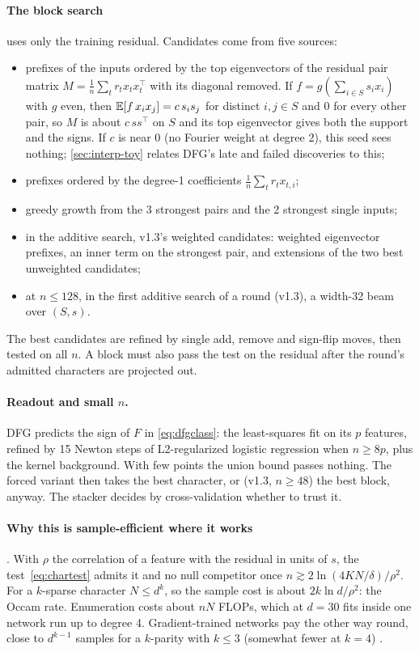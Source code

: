 \paragraph{The block search} uses only the training residual. Candidates come from five sources:
\begin{itemize}
\item prefixes of the inputs ordered by the top eigenvectors of the residual pair matrix $M=\frac1n\sum_tr_tx_tx_t^\top$ with its diagonal removed. If $f=g(\sum_{i\in S}s_ix_i)$ with $g$ even, then $\mathbb{E}[f\,x_ix_j]=c\,s_is_j$ for distinct $i,j\in S$ and 0 for every other pair, so $M$ is about $c\,ss^\top$ on $S$ and its top eigenvector gives both the support and the signs. If $c$ is near 0 (no Fourier weight at degree 2), this seed sees nothing; \cref{sec:interp-toy} relates DFG's late and failed discoveries to this;
\item prefixes ordered by the degree-1 coefficients $\frac1n\sum_tr_tx_{t,i}$;
\item greedy growth from the 3 strongest pairs and the 2 strongest single inputs;
\item in the additive search, v1.3's weighted candidates: weighted eigenvector prefixes, an inner term on the strongest pair, and extensions of the two best unweighted candidates;
\item at $n\le128$, in the first additive search of a round (v1.3), a width-32 beam over $(S,s)$.
\end{itemize}
The best candidates are refined by single add, remove and sign-flip moves, then tested on all $n$. A block must also pass the test on the residual after the round's admitted characters are projected out.

\paragraph{Readout and small $n$.} DFG predicts the sign of $F$ in \eqref{eq:dfgclass}: the least-squares fit on its $p$ features, refined by 15 Newton steps of L2-regularized logistic regression when $n\ge8p$, plus the kernel background. With few points the union bound passes nothing. The forced variant then takes the best character, or (v1.3, $n\ge48$) the best block, anyway. The stacker decides by cross-validation whether to trust it.

\paragraph{Why this is sample-efficient where it works} . With $\rho$ the correlation of a feature with the residual in units of $s$, the test~\eqref{eq:chartest} admits it and no null competitor once $n\gtrsim2\ln(4KN/\delta)/\rho^2$. For a $k$-sparse character $N\le d^k$, so the sample cost is about $2k\ln d/\rho^2$: the Occam rate. Enumeration costs about $nN$ FLOPs, which at $d=30$ fits inside one network run up to degree 4. Gradient-trained networks pay the other way round, close to $d^{k-1}$ samples for a $k$-parity with $k\le3$ (somewhat fewer at $k=4$) \cite{abbe2023leap,gdcircuit2026}.

